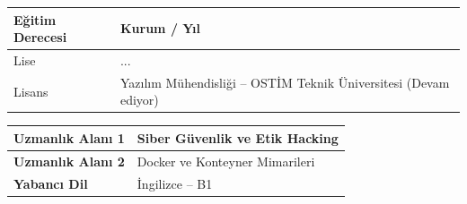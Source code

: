 \vspace{0.4cm}

\begin{tabular}{|L{4.5cm}|L{9.5cm}|}
\hline
\textbf{Eğitim Derecesi} & \textbf{Kurum / Yıl} \\
\hline
Lise & ... \\
\hline
Lisans & Yazılım Mühendisliği -- OSTİM Teknik Üniversitesi (Devam ediyor) \\
\hline
\end{tabular}

\vspace{0.4cm}

\begin{tabular}{|L{4.5cm}|L{9.5cm}|}
\hline
\textbf{Uzmanlık Alanı 1} & Siber Güvenlik ve Etik Hacking \\
\hline
\textbf{Uzmanlık Alanı 2} & Docker ve Konteyner Mimarileri \\
\hline
\textbf{Yabancı Dil} & İngilizce -- B1 \\
\hline
\end{tabular}

\clearpage
